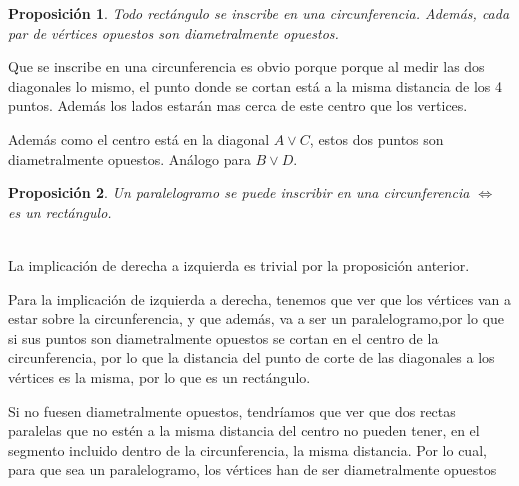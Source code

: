 \documentclass[11pt, a4paper]{article}
\makeatletter
\newif\IfInSansMode
\let\oldsf\sffamily
\renewcommand*{\sffamily}{\oldsf\mathversion{sans}\InSansModetrue}
\let\oldnorm\normalfont
\renewcommand*{\normalfont}{\oldnorm\InSansModefalse\mathversion{normal}}
\renewenvironment{proof}[1][\proofname] {\vspace{-15pt}\par\pushQED{\qed}\normalfont\topsep6\p@\@plus6\p@\relax\trivlist\item[\hskip\labelsep\it#1\@addpunct{.}]\ignorespaces}{\popQED\endtrivlist\@endpefalse}
\renewenvironment{proof}[1][\proofname] {\par\pushQED{\qed}\normalfont\topsep6\p@\@plus6\p@\relax\trivlist\item[\hskip\labelsep\itshape\sffamily#1\@addpunct{.}]\ignorespaces}{\popQED\endtrivlist\@endpefalse}
\theoremstyle{theorem-style}
\newtheorem{nprop}{Proposición}[section]
\theoremstyle{definition-style}
\theoremstyle{remark-style}
\theoremstyle{example-style}
\makeatother
\begin{document}
\begin{nprop}
  Todo rectángulo se inscribe en una circunferencia. Además, cada par de vértices opuestos son diametralmente opuestos.
\end{nprop}

\begin{proof}
	Que se inscribe en una circunferencia es obvio porque porque al medir las dos diagonales lo mismo, el punto donde se cortan está a la misma distancia de los 4 puntos. Además los lados estarán mas cerca de este centro que los vertices. 
	
	Además como el centro está en la diagonal $A\vee C$, estos dos puntos son diametralmente opuestos. Análogo para $B\vee D$.
\end{proof}


\begin{nprop}
  Un paralelogramo se puede inscribir en una circunferencia $\iff$ es un rectángulo.
\end{nprop}

\begin{proof}\hfill\\
	La implicación de derecha a izquierda es trivial por la proposición anterior.
	
	Para la implicación de izquierda a derecha, tenemos que ver que los vértices van a estar sobre la circunferencia, y que además, va a ser un paralelogramo,por lo que si sus puntos son diametralmente opuestos se cortan en el centro de la circunferencia, por lo que la distancia del punto de corte de las diagonales a los vértices es la misma, por lo que es un rectángulo. 
	
	Si no fuesen diametralmente opuestos, tendríamos que ver que dos rectas paralelas que no estén a la misma distancia del centro no pueden tener, en el segmento incluido dentro de la circunferencia, la misma distancia. Por lo cual, para que sea un paralelogramo, los vértices han de ser diametralmente opuestos 
\end{proof}
























\newpage
\end{document}
